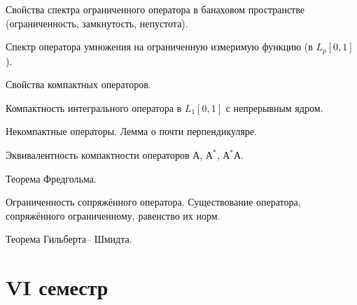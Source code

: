 \documentclass[a4paper]{article}
\begin{document}
\begin{nums}{-2}
\item Свойства спектра ограниченного оператора в банаховом пространстве (ограниченность,
замкнутость, непустота).
\item Спектр оператора умножения на ограниченную измеримую функцию (в $L_p[0,1]$).
\item Свойства компактных операторов.
\item Компактность интегрального оператора в $L_1[0,1]$ с непрерывным ядром.
\item Некомпактные операторы. Лемма о почти перпендикуляре.
\item Эквивалентность компактности операторов $А$, $А^*$, $А^*А$.
\item Теорема Фредгольма.
\item Ограниченность сопряжённого оператора. Существование оператора, сопряжённого
ограниченному, равенство их норм.
\item Теорема Гильберта-- Шмидта.
\end{nums}

\pagebreak

\section*{VI семестр}
\end{document}
